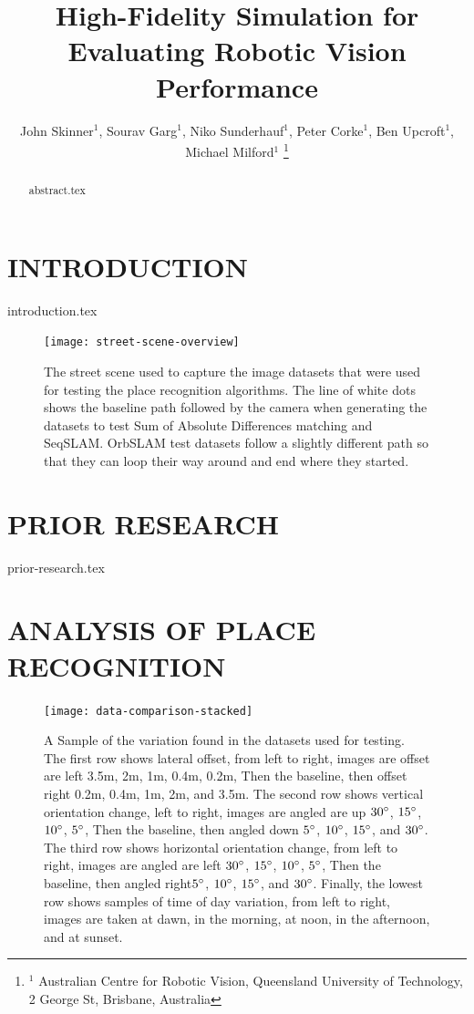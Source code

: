 \documentclass[letterpaper, 10 pt, conference]{ieeeconf}  %
\title{\LARGE \bf
High-Fidelity Simulation for Evaluating Robotic Vision Performance
}
\author{John Skinner$^{1}$, Sourav Garg$^{1}$, Niko Sunderhauf$^{1}$, Peter Corke$^{1}$, Ben Upcroft$^{1}$, Michael Milford$^{1}$%
\thanks{$^{1}$ Australian Centre for Robotic Vision,
        Queensland University of Technology,
        2 George St, Brisbane, Australia}%
}
\begin{document}
\maketitle
\thispagestyle{empty}
\pagestyle{empty}


\begin{abstract}

{abstract.tex}

\end{abstract}


\section{INTRODUCTION}

{introduction.tex}

\begin{figure}[t]
    \centering
    \texttt{[image: street-scene-overview]}
    \caption{The street scene used to capture the image datasets that were used for testing the place recognition algorithms. The line of white dots shows the baseline path followed by the camera when generating the datasets to test Sum of Absolute Differences matching and SeqSLAM. OrbSLAM test datasets follow a slightly different path so that they can loop their way around and end where they started.}
    \label{fig:street-scene-overview}
\end{figure}

\section{PRIOR RESEARCH}

{prior-research.tex}

\section{ANALYSIS OF PLACE RECOGNITION}

\begin{figure}[t]
    \centering
    \texttt{[image: data-comparison-stacked]}
    \caption{A Sample of the variation found in the datasets used for testing. The first row shows lateral offset, from left to right, images are offset are left 3.5m, 2m, 1m, 0.4m, 0.2m, Then the baseline, then offset right 0.2m, 0.4m, 1m, 2m, and 3.5m. The second row shows vertical orientation change,  left to right, images are angled are up $30\degree$, $15\degree$, $10\degree$, $5\degree$, Then the baseline, then angled down $5\degree$, $10\degree$, $15\degree$, and $30\degree$. The third row shows horizontal orientation change, from left to right, images are angled are left $30\degree$, $15\degree$, $10\degree$, $5\degree$, Then the baseline, then angled right$5\degree$, $10\degree$, $15\degree$, and $30\degree$. Finally, the lowest row shows samples of time of day variation, from left to right, images are taken at dawn, in the morning, at noon, in the afternoon, and at sunset.}
    \label{fig:dataset-example}
\end{figure}
\end{document}
